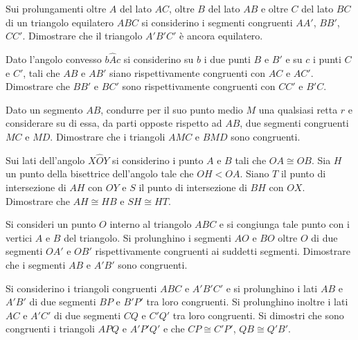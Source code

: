 \begin{multicols}{2}
\begin{esercizio}
\label{ese:2.18}
Sui prolungamenti oltre $A$ del lato $AC$, oltre $B$ del lato $AB$ e oltre $C$ del lato $BC$ di un triangolo equilatero $ABC$ si considerino i segmenti congruenti $AA'$, $BB'$, $CC'$. Dimostrare che il triangolo $A'B'C'$ è ancora equilatero.
\end{esercizio}

\begin{esercizio}
\label{ese:2.19}
Dato l'angolo convesso $b\widehat{A}c$ si considerino su $b$ i due punti $B$ e $B'$ e su $c$ i punti $C$ e $C'$, tali che $AB$ e $AB'$ siano rispettivamente congruenti con $AC$ e $AC'$. Dimostrare che $BB'$ e $BC'$ sono rispettivamente congruenti con $CC'$ e $B'C$.
\end{esercizio}

\begin{esercizio}
\label{ese:2.20}
Dato un segmento $AB$, condurre per il suo punto medio $M$ una qualsiasi retta $r$ e considerare su di essa, da parti opposte rispetto ad $AB$, due segmenti congruenti $MC$ e $MD$. Dimostrare che i triangoli $AMC$ e $BMD$ sono congruenti.
\end{esercizio}

\begin{esercizio}
\label{ese:2.21}
Sui lati dell'angolo $X\widehat{O}Y$ si considerino i punto $A$ e $B$ tali che $OA\cong OB$. Sia $H$ un punto della bisettrice dell'angolo tale che $OH<OA$. Siano $T$ il punto di intersezione di $AH$ con $OY$ e $S$ il punto di intersezione di $BH$ con $OX$. Dimostrare che $AH\cong HB$ e $SH\cong HT$.
\end{esercizio}

\begin{esercizio}
\label{ese:2.22}
Si consideri un punto $O$ interno al triangolo $ABC$ e si congiunga tale punto con i vertici $A$ e $B$ del triangolo. Si prolunghino i segmenti $AO$ e $BO$ oltre $O$ di due segmenti $OA'$ e $OB'$ rispettivamente congruenti ai suddetti segmenti. Dimostrare che i segmenti $AB$ e $A'B'$ sono congruenti.
\end{esercizio}

\begin{esercizio}
\label{ese:2.23}
Si considerino i triangoli congruenti $ABC$ e $A'B'C'$ e si prolunghino i lati $AB$ e $A'B'$ di due segmenti $BP$ e $B'P'$ tra loro congruenti. Si prolunghino inoltre i lati $AC$ e $A'C'$ di due segmenti $CQ$ e $C'Q'$ tra loro congruenti. Si dimostri che sono congruenti i triangoli $APQ$ e $A'P'Q'$ e che $CP\cong C'P'$, $QB\cong Q'B'$.
\end{esercizio}


\end{multicols}

